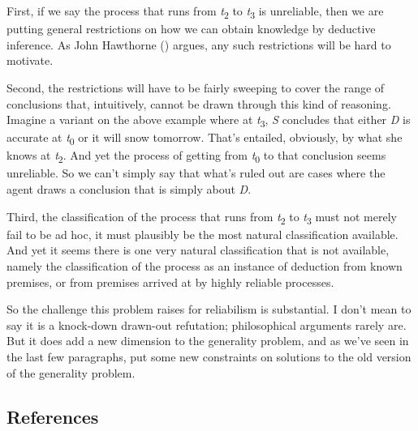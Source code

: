 \documentclass[
  11pt,
  letterpaper,
  DIV=11,
  numbers=noendperiod,
  twoside]{scrartcl}
\begin{document}
First, if we say the process that runs from \emph{t}\textsubscript{2} to
\emph{t}\textsubscript{3} is unreliable, then we are putting general
restrictions on how we can obtain knowledge by deductive inference. As
John Hawthorne () argues, any
such restrictions will be hard to motivate.

Second, the restrictions will have to be fairly sweeping to cover the
range of conclusions that, intuitively, cannot be drawn through this
kind of reasoning. Imagine a variant on the above example where at
\emph{t}\textsubscript{3}, \emph{S} concludes that either \emph{D} is
accurate at \emph{t}\textsubscript{0} or it will snow tomorrow. That's
entailed, obviously, by what she knows at \emph{t}\textsubscript{2}. And
yet the process of getting from \emph{t}\textsubscript{0} to that
conclusion seems unreliable. So we can't simply say that what's ruled
out are cases where the agent draws a conclusion that is simply about
\emph{D}.

Third, the classification of the process that runs from
\emph{t}\textsubscript{2} to \emph{t}\textsubscript{3} must not merely
fail to be ad hoc, it must plausibly be the most natural classification
available. And yet it seems there is one very natural classification
that is not available, namely the classification of the process as an
instance of deduction from known premises, or from premises arrived at
by highly reliable processes.

So the challenge this problem raises for reliabilism is substantial. I
don't mean to say it is a knock-down drawn-out refutation; philosophical
arguments rarely are. But it does add a new dimension to the generality
problem, and as we've seen in the last few paragraphs, put some new
constraints on solutions to the old version of the generality problem.

\subsection*{References}\label{references}
\end{document}
